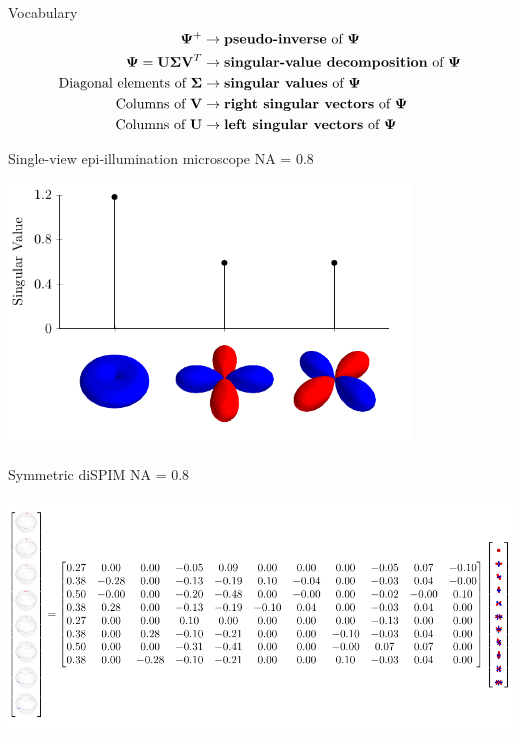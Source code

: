 \documentclass[presentation]{beamer}
\begin{document}
\begin{frame}{Vocabulary}
  \begin{align*}
    \mathbf{\Psi}^{+}&\rightarrow \text{\textbf{pseudo-inverse} of}\ \mathbf{\Psi}\\
    \mathbf{\Psi} = \mathbf{U\Sigma V}^T&\rightarrow \text{\textbf{singular-value decomposition} of}\ \mathbf{\Psi}\\
    \text{Diagonal elements of}\ \mathbf{\Sigma}&\rightarrow \text{\textbf{singular values} of}\ \mathbf{\Psi}\\
    \text{Columns of}\ \mathbf{V}&\rightarrow \text{\textbf{right singular vectors} of}\ \mathbf{\Psi}\\
    \text{Columns of}\ \mathbf{U}&\rightarrow \text{\textbf{left singular vectors} of}\ \mathbf{\Psi}\\        
  \end{align*}
\end{frame}

\begin{frame}{Single-view epi-illumination microscope NA = 0.8}
\begin{center}
  \includegraphics[width=0.8\textwidth, interpolate=true]{figs/svs_epi}
\end{center}
\end{frame}

\begin{frame}{Symmetric diSPIM NA = 0.8}
\begin{center}
  \includegraphics[width=1.0\textwidth, interpolate=true]{figs/dispim/matrix}
\end{center}
\end{frame}
\end{document}
